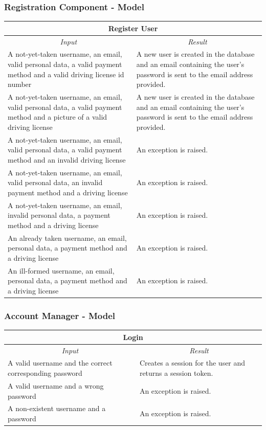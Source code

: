 \documentclass[english]{article}
\begin{document}
\subsubsection{Registration Component - Model}
\begin{center}
	\begin{tabular}{ | p{6cm} | p{6cm} | }
		\hline 
		\multicolumn{2}{|c|}{\textbf{Register User}} \\
		\hline
		\multicolumn{1}{|c|}{\textit{Input}} & \multicolumn{1}{c|}{\textit{Result}} \\
		\hline
		A not-yet-taken username, an email, valid personal data, a valid payment method and a valid driving license id number & A new user is created in the database and an email containing the user's password is sent to the email address provided. \\
		\hline
		A not-yet-taken username, an email, valid personal data, a valid payment method and a picture of a valid driving license & A new user is created in the database and an email containing the user's password is sent to the email address provided. \\
		\hline
		A not-yet-taken username, an email, valid personal data, a valid payment method and an invalid driving license & An exception is raised. \\
		\hline
		A not-yet-taken username, an email, valid personal data, an invalid payment method and a driving license & An exception is raised. \\
		\hline
		A not-yet-taken username, an email, invalid personal data, a payment method and a driving license & An exception is raised. \\
		\hline
		An already taken username, an email, personal data, a payment method and a driving license & An exception is raised. \\
		\hline
		An ill-formed username, an email, personal data, a payment method and a driving license & An exception is raised. \\
		\hline
	\end{tabular}
\end{center}

\subsubsection{Account Manager - Model}
\begin{center}
	\begin{tabular}{ | p{6cm} | p{6cm} | }
		\hline 
		\multicolumn{2}{|c|}{\textbf{Login}} \\
		\hline
		\multicolumn{1}{|c|}{\textit{Input}} & \multicolumn{1}{c|}{\textit{Result}} \\
		\hline
		A valid username and the correct corresponding password  & Creates a session for the user and returns a session token. \\
		\hline
		A valid username and a wrong password & An exception is raised. \\
		\hline
		A non-existent username and a password & An exception is raised. \\
		\hline
	\end{tabular}
\end{center}
\end{document}
